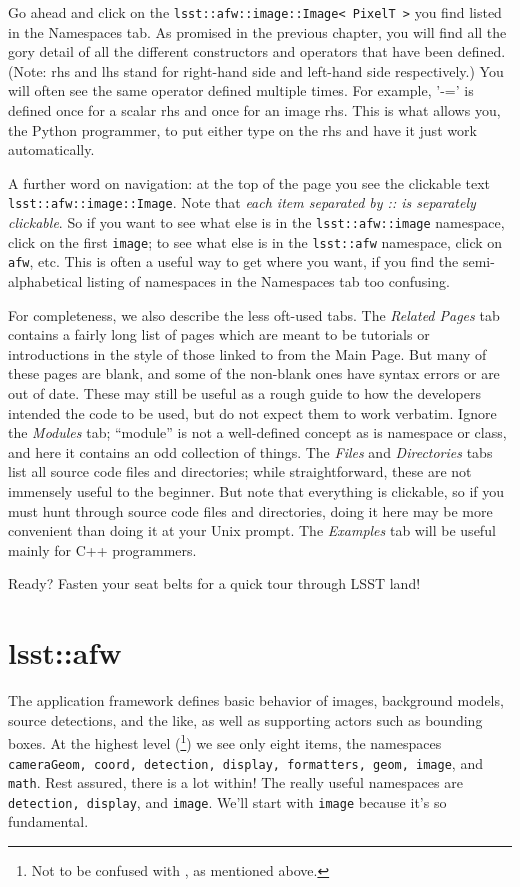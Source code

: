 Go ahead and click on the \texttt{lsst::afw::image::Image< PixelT >}
you find listed in the Namespaces tab.  As promised in the previous
chapter, you will find all the gory detail of all the different
constructors and operators that have been defined.  (Note: rhs and lhs
stand for right-hand side and left-hand side respectively.)  You will
often see the same operator defined multiple times.  For example, '-='
is defined once for a scalar rhs and once for an image rhs.  This is
what allows you, the Python programmer, to put either type on the rhs
and have it just work automatically.

A further word on navigation: at the top of the page you see the
clickable text \texttt{lsst::afw::image::Image}.  Note that {\it each
  item separated by :: is separately clickable}.  So if you want to
see what else is in the \texttt{lsst::afw::image} namespace, click on
the first \texttt{image}; to see what else is in the
\texttt{lsst::afw} namespace, click on \texttt{afw}, etc.  This is
often a useful way to get where you want, if you find the
semi-alphabetical listing of namespaces in the Namespaces tab too
confusing.

For completeness, we also describe the less oft-used tabs.  The {\it
  Related Pages} tab contains a fairly long list of pages which are
meant to be tutorials or introductions in the style of those linked to
from the Main Page.  But many of these pages are blank, and some of
the non-blank ones have syntax errors or are out of date.  These may
still be useful as a rough guide to how the developers intended the
code to be used, but do not expect them to work verbatim.  Ignore the
{\it Modules} tab; ``module'' is not a well-defined concept as is
namespace or class, and here it contains an odd collection of things.
The {\it Files} and {\it Directories} tabs list all source code files and
directories; while straightforward, these are not immensely useful to
the beginner.  But note that everything is clickable, so if you must
hunt through source code files and directories, doing it here may be
more convenient than doing it at your Unix prompt.  The {\it Examples}
tab will be useful mainly for C++ programmers.

Ready?  Fasten your seat belts for a quick tour through LSST land!

\section{lsst::afw}

The application framework defines basic behavior of images, background
models, source detections, and the like, as well as supporting actors
such as bounding boxes. At the highest level (\footnote{Not
  to be confused with ,
    as mentioned above.}) we see only eight items, the namespaces
\texttt{cameraGeom, coord, detection, display, formatters, geom,
  image}, and \texttt{math}.  Rest assured, there is a lot within!
The really useful namespaces are \texttt{detection, display}, and
\texttt{image}.  We'll start with \texttt{image} because it's so
fundamental.

